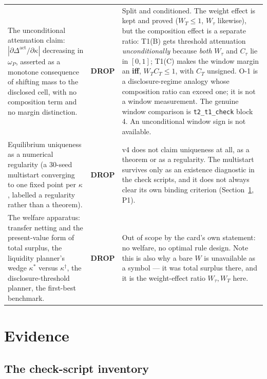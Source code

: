 \documentclass[11pt,a4paper]{article}
\newcommand{\Dact}{\Delta^{\mathrm{act}}}
\begin{document}
\begin{longtable}{@{}>{\raggedright\arraybackslash}p{}>{\raggedright\arraybackslash}p{}>{\raggedright\arraybackslash}p{}@{}}
The unconditional attenuation claim: $|\partial\Dact/\partial\kappa|$ decreasing in
$\omega_P$, asserted as a monotone consequence of shifting mass to the disclosed
cell, with no composition term and no margin distinction. &
\textbf{DROP} &
Split and conditioned. The weight effect is kept and proved ($W_T\le1$, $W_\tau$
likewise), but the composition effect is a separate ratio: T1(B) gets threshold
attenuation \emph{unconditionally} because \emph{both} $W_\tau$ and $C_\tau$ lie in
$[0,1]$; T1(C) makes the window margin an \textbf{iff}, $W_TC_T\le1$, with $C_T$
unsigned. O-1 is a disclosure-regime analogy whose composition ratio can exceed one;
it is not a window measurement. The genuine window comparison is
\texttt{t2\_t1\_check} block 4. An unconditional window sign is not available. \\
\addlinespace

Equilibrium uniqueness as a numerical regularity (a 30-seed multistart converging to
one fixed point per $\kappa$, labelled a regularity rather than a theorem). &
\textbf{DROP} &
v4 does not claim uniqueness at all, as a theorem or as a regularity. The multistart
survives only as an existence diagnostic in the check scripts, and it does not
always clear its own binding criterion (Section~\ref{sec:evidence}, P1). \\
\addlinespace

The welfare apparatus: transfer netting and the present-value form of total surplus,
the liquidity planner's wedge $\kappa^{\ast}$ versus $\kappa^{\dagger}$, the
disclosure-threshold planner, the first-best benchmark. &
\textbf{DROP} &
Out of scope by the card's own statement: no welfare, no optimal rule design. Note
this is also why a bare $W$ is unavailable as a symbol --- it was total surplus
there, and it is the weight-effect ratio $W_\tau,W_T$ here. \\
\end{longtable}
\endgroup

\section{Evidence}
\label{sec:evidence}

\subsection*{The check-script inventory}
\end{document}
